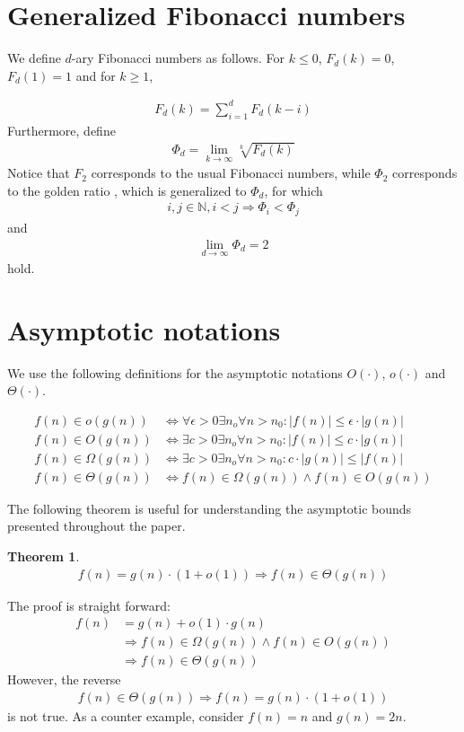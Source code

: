 \documentclass[a4paper,12pt]{article}
\newtheorem{theorem}{Theorem}
\begin{document}
\appendix
\section{Generalized Fibonacci numbers}
\label{sec:fibonacci}
We define $d$-ary Fibonacci numbers as follows. For $k \leq0$, $F_d(k) = 0$, $F_d(1) = 1$ and for $k \geq 1$,

\begin{align}
F_d(k) = \sum_{i=1}^{d}F_d(k-i)
\end{align}
Furthermore, define 
\begin{align}\label{eqn:goldenFib}
\Phi_d = \lim_{k \rightarrow \infty} \sqrt[k]{F_d(k)}
\end{align}
Notice that $F_2$ corresponds to the usual Fibonacci numbers, while $\Phi_2 $ corresponds to the golden ratio \cite{Knuth73}, which is generalized to $\Phi_d$, for which 
\begin{align}
i, j \in \mathbb{N}, i < j \Rightarrow \Phi_i < \Phi_j
\end{align}
and 
\begin{align}
\lim_{d\rightarrow \infty} \Phi_d = 2
\end{align}
hold.

\section{Asymptotic notations}
\label{sec:asymptotic}
We use the following definitions for the asymptotic notations $O(\cdot)$, $o(\cdot)$ and $\Theta(\cdot)$.

\begin{align*}
f(n) \in o(g(n)) &\Leftrightarrow \forall \epsilon > 0 \exists n_o\forall n> n_0: |f(n)|\leq \epsilon \cdot |g(n)|\\
f(n) \in O(g(n)) &\Leftrightarrow \exists c > 0 \exists n_o\forall n> n_0: |f(n)|\leq c \cdot |g(n)|\\
f(n) \in \Omega(g(n)) &\Leftrightarrow \exists c > 0 \exists n_o\forall n> n_0: c \cdot |g(n)| \leq |f(n)| \\
f(n) \in \Theta(g(n)) &\Leftrightarrow f(n) \in \Omega(g(n)) \land f(n)\in O(g(n))
\end{align*}

The following theorem is useful for understanding the asymptotic bounds presented throughout the paper.
\begin{theorem}\label{theorem:asymptotic}
\begin{align*}
f(n) = g(n) \cdot (1+o(1)) \Rightarrow f(n) \in \Theta(g(n)) 
\end{align*}
\end{theorem}
The proof is straight forward:
\begin{align*}
f(n) &= g(n)+o(1)\cdot g(n) \\
&\Rightarrow f(n) \in \Omega(g(n)) \land f(n) \in O(g(n)) \\
&\Rightarrow f(n) \in \Theta(g(n))
\end{align*}
However, the reverse
\begin{align*}
f(n) \in \Theta(g(n)) \Rightarrow f(n) = g(n) \cdot (1+o(1)) 
\end{align*}
is not true. As a counter example, consider $f(n) = n$ and $g(n) = 2n$.
\end{document}
